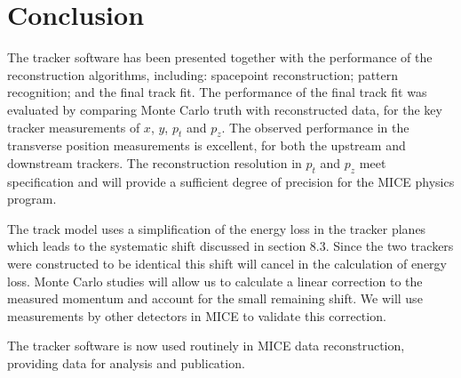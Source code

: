 \section{Conclusion}
\label{sec:Conclusion}
The tracker software has been presented together with the performance of the reconstruction algorithms, including: spacepoint reconstruction; pattern recognition; and the final track fit. The performance of the final track fit was evaluated by comparing Monte Carlo truth with reconstructed data, for the key tracker measurements of $x$, $y$, $p_{t}$ and $p_z$.  The observed performance in the transverse position measurements is excellent, for both the upstream and downstream trackers. The reconstruction resolution in $p_t$ and $p_z$ meet specification and will provide a sufficient degree of precision for the MICE physics program. 

The track model uses a simplification of the energy loss in the tracker planes which leads to the systematic shift discussed in section 8.3. Since the two trackers were constructed to be identical this shift will cancel in the calculation of energy loss. Monte Carlo studies will allow us to calculate a linear correction to the measured momentum and account for the small remaining shift. We will use measurements by other detectors in MICE to validate this correction.

The tracker software is now used routinely in MICE data reconstruction, providing data for analysis and publication.

% 

